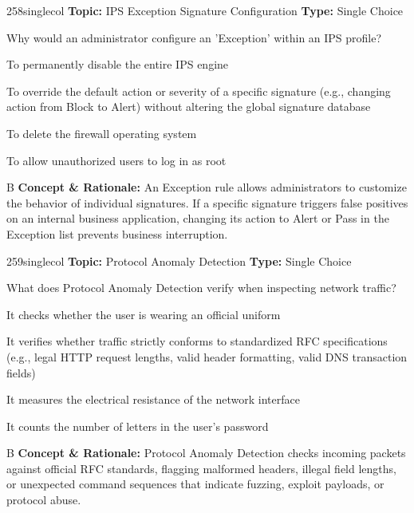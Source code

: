 \begin{qcard}{258}{singlecol}
\textcolor{darkslate!75}{\small\textbf{Topic:} IPS Exception Signature Configuration \hfill \textbf{Type:} Single Choice}\vspace{0.4em}\par
Why would an administrator configure an 'Exception' within an IPS profile?
\begin{qoptions}
\item To permanently disable the entire IPS engine
\item To override the default action or severity of a specific signature (e.g., changing action from Block to Alert) without altering the global signature database
\item To delete the firewall operating system
\item To allow unauthorized users to log in as root
\end{qoptions}
\end{qcard}
\nopagebreak
\begin{explainbox}{B}
\textbf{Concept \& Rationale:} An Exception rule allows administrators to customize the behavior of individual signatures. If a specific signature triggers false positives on an internal business application, changing its action to Alert or Pass in the Exception list prevents business interruption.
\end{explainbox}

\begin{qcard}{259}{singlecol}
\textcolor{darkslate!75}{\small\textbf{Topic:} Protocol Anomaly Detection \hfill \textbf{Type:} Single Choice}\vspace{0.4em}\par
What does Protocol Anomaly Detection verify when inspecting network traffic?
\begin{qoptions}
\item It checks whether the user is wearing an official uniform
\item It verifies whether traffic strictly conforms to standardized RFC specifications (e.g., legal HTTP request lengths, valid header formatting, valid DNS transaction fields)
\item It measures the electrical resistance of the network interface
\item It counts the number of letters in the user's password
\end{qoptions}
\end{qcard}
\nopagebreak
\begin{explainbox}{B}
\textbf{Concept \& Rationale:} Protocol Anomaly Detection checks incoming packets against official RFC standards, flagging malformed headers, illegal field lengths, or unexpected command sequences that indicate fuzzing, exploit payloads, or protocol abuse.
\end{explainbox}

